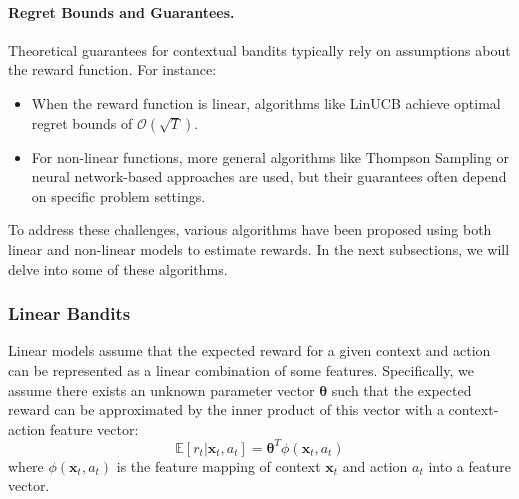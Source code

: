 \paragraph{Regret Bounds and Guarantees.} 
Theoretical guarantees for contextual bandits typically rely on assumptions about the reward function. For instance:
\begin{itemize}
    \item When the reward function is linear, algorithms like LinUCB \citep{li2010contextual} achieve optimal regret bounds of $\mathcal{O}(\sqrt{T})$.
    \item For non-linear functions, more general algorithms like Thompson Sampling \citep{russo2018tutorial} or neural network-based approaches \citep{riquelme2018deep} are used, but their guarantees often depend on specific problem settings.
\end{itemize}

To address these challenges, various algorithms have been proposed using both linear and non-linear models to estimate rewards. In the next subsections, we will delve into some of these algorithms.

\subsubsection{Linear Bandits}
Linear models assume that the expected reward for a given context and action can be represented as a linear combination of some features. Specifically, we assume there exists an unknown parameter vector $\boldsymbol{\theta}$ such that the expected reward can be approximated by the inner product of this vector with a context-action feature vector:
\begin{equation}
    \mathbb{E}[r_t | \mathbf{x}_t, a_t] = \boldsymbol{\theta}^T \phi(\mathbf{x}_t, a_t)
\end{equation}
where $\phi(\mathbf{x}_t, a_t)$ is the feature mapping of context $\mathbf{x}_t$ and action $a_t$ into a feature vector.

